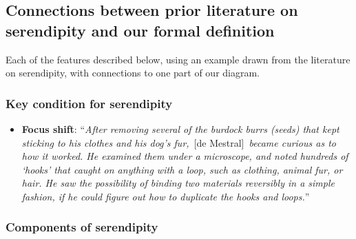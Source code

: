 \subsection{Connections between prior literature on serendipity and our formal definition} \label{sec:connections-to-formal-definition}

Each of the features described below, using an example drawn from the
literature on serendipity, with connections to one part of our diagram.

\subsubsection*{Key condition for serendipity}

\begin{itemize}
\item \textbf{Focus shift}: ``\emph{After removing several of the
  burdock burrs (seeds) that kept sticking to his clothes and his
  dog's fur,}~[de Mestral]~\emph{became curious as to how it
  worked. He examined them under a microscope, and noted hundreds of
  `hooks' that caught on anything with a loop, such as clothing,
  animal fur, or hair. He saw the possibility of binding two materials
  reversibly in a simple fashion, if he could figure out how to
  duplicate the hooks and loops.}''~\cite{wiki:velcro}
%
\end{itemize}

\subsubsection*{Components of serendipity}


